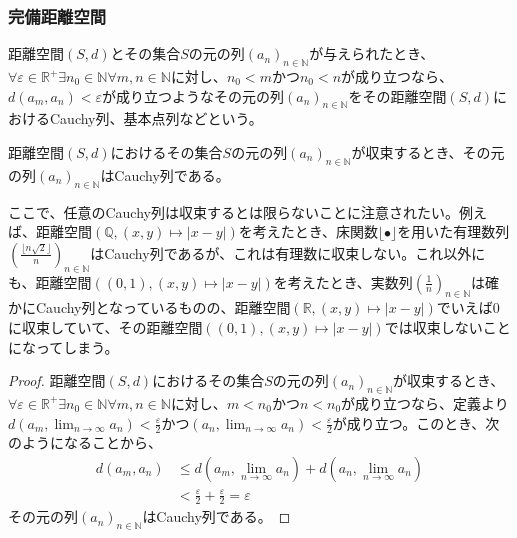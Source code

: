 \documentclass[dvipdfmx]{jsarticle}
\begin{document}
\subsubsection{完備距離空間}%
\begin{dfn}
距離空間$(S,d)$とその集合$S$の元の列$\left( a_{n} \right)_{n \in \mathbb{N}}$が与えられたとき、$\forall\varepsilon \in \mathbb{R}^{+}\exists n_{0} \in \mathbb{N}\forall m,n \in \mathbb{N}$に対し、$n_{0} < m$かつ$n_{0} < n$が成り立つなら、$d\left( a_{m},a_{n} \right) < \varepsilon$が成り立つようなその元の列$\left( a_{n} \right)_{n \in \mathbb{N}}$をその距離空間$(S,d)$におけるCauchy列、基本点列などという。
\end{dfn}
\begin{thm}\label{8.2.4.7}
距離空間$(S,d)$におけるその集合$S$の元の列$\left( a_{n} \right)_{n \in \mathbb{N}}$が収束するとき、その元の列$\left( a_{n} \right)_{n \in \mathbb{N}}$はCauchy列である。
\end{thm}\par
ここで、任意のCauchy列は収束するとは限らないことに注意されたい。例えば、距離空間$\left(\mathbb{Q},\left( x,y\right) \mapsto \left| x - y \right| \right)$を考えたとき、床関数$\lfloor \bullet \rfloor$を用いた有理数列$\left(\frac{\lfloor n\sqrt{2} \rfloor}{n}\right)_{n\in \mathbb{N}}$はCauchy列であるが、これは有理数に収束しない。これ以外にも、距離空間$\left((0,1),\left( x,y\right) \mapsto \left| x - y \right| \right)$を考えたとき、実数列$\left( \frac{1}{n} \right)_{n\in \mathbb{N}}$は確かにCauchy列となっているものの、距離空間$\left(\mathbb{R},\left( x,y\right) \mapsto \left| x - y \right| \right)$でいえば$0$に収束していて、その距離空間$\left((0,1),\left( x,y\right) \mapsto \left| x - y \right| \right)$では収束しないことになってしまう。
\begin{proof}
距離空間$(S,d)$におけるその集合$S$の元の列$\left( a_{n} \right)_{n \in \mathbb{N}}$が収束するとき、$\forall\varepsilon \in \mathbb{R}^{+}\exists n_{0} \in \mathbb{N}\forall m,n \in \mathbb{N}$に対し、$m < n_{0}$かつ$n < n_{0}$が成り立つなら、定義より$d\left( a_{m},\lim_{n \rightarrow \infty}a_{n} \right) < \frac{\varepsilon}{2}$かつ$\left( a_{n},\lim_{n \rightarrow \infty}a_{n} \right) < \frac{\varepsilon}{2}$が成り立つ。このとき、次のようになることから、
\begin{align*}
d\left( a_{m},a_{n} \right) &\leq d\left( a_{m},\lim_{n \rightarrow \infty}a_{n} \right) + d\left( a_{n},\lim_{n \rightarrow \infty}a_{n} \right)\\
&< \frac{\varepsilon}{2} + \frac{\varepsilon}{2} = \varepsilon
\end{align*}
その元の列$\left( a_{n} \right)_{n \in \mathbb{N}}$はCauchy列である。
\end{proof}
\end{document}
